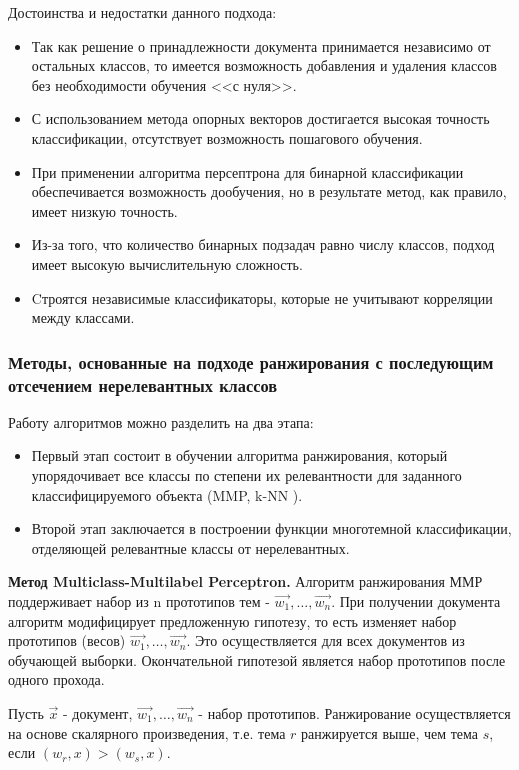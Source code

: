 \documentclass[russian, utf8, emptystyle]{eskdtext}
\begin{document}
Достоинства и недостатки данного подхода:
\begin{itemize}
	\item Так как решение о принадлежности документа принимается независимо от остальных классов, то имеется возможность добавления и удаления классов без необходимости обучения <<с нуля>>.
	\item С использованием метода опорных векторов достигается высокая точность классификации, отсутствует возможность пошагового обучения.
	\item При применении алгоритма персептрона для бинарной классификации обеспечивается возможность дообучения, но в результате метод, как правило, имеет низкую точность.
	\item Из-за того, что количество бинарных подзадач равно числу классов, подход имеет высокую вычислительную сложность.
	\item Cтроятся независимые классификаторы, которые не учитывают корреляции между классами.
\end{itemize}
\subsubsection{Методы, основанные на подходе ранжирования с последующим отсечением нерелевантных классов}
Работу алгоритмов можно разделить на два этапа:
\begin{itemize}
	\item Первый этап состоит в обучении алгоритма ранжирования, который упорядочивает все классы по степени их релевантности для заданного классифицируемого объекта (MMP\cite{MMP1,MMP2}, k-NN \cite{kNN3}).
	\item Второй этап заключается в построении функции многотемной классификации, отделяющей релевантные классы от нерелевантных.
\end{itemize}

{\bf Метод Multiclass-Multilabel Perceptron.} Алгоритм ранжирования ММР поддерживает набор из n прототипов тем - $\vec{w_1},\ldots,\vec{w_n}$. При получении документа алгоритм модифицирует предложенную гипотезу, то есть изменяет набор прототипов (весов) $\vec{w_1},\ldots,\vec{w_n}$. Это осуществляется для всех документов из обучающей выборки. Окончательной гипотезой является набор прототипов после одного прохода.

Пусть $\vec{x}$ - документ, $\vec{w_1},\ldots,\vec{w_n}$ - набор прототипов. Ранжирование осуществляется на основе скалярного произведения, т.е. тема $r$ ранжируется выше, чем тема $s$, если $(w_r,x)>(w_s,x)$.
\end{document}
